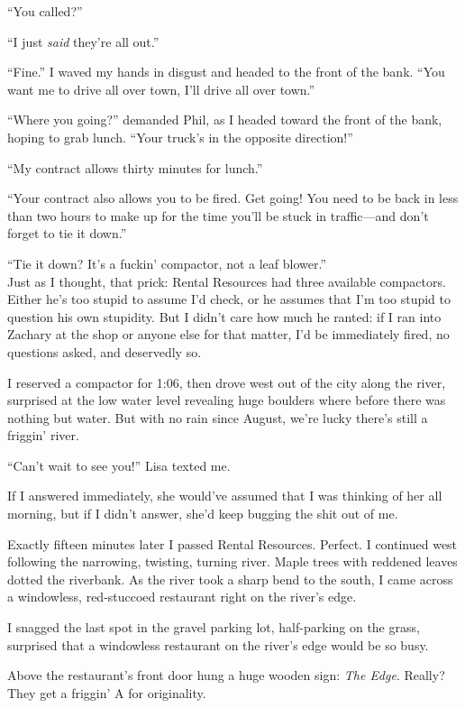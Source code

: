 ``You called?''

``I just \emph{said} they're all out.''

``Fine.'' I waved my hands in disgust and headed to the front of the
bank. ``You want me to drive all over town, I'll drive all over town.''

``Where you going?'' demanded Phil, as I headed toward the front of the
bank, hoping to grab lunch. ``Your truck's in the opposite direction!''

``My contract allows thirty minutes for lunch.''

``Your contract also allows you to be fired. Get going! You need to be
back in less than two hours to make up for the time you'll be stuck in
traffic---and don't forget to tie it down.''

``Tie it down? It's a fuckin' compactor, not a leaf blower.''\\

Just as I thought, that prick: Rental Resources had three available
compactors. Either he's too stupid to assume I'd check, or he assumes
that I'm too stupid to question his own stupidity. But I didn't care how
much he ranted: if I ran into Zachary at the shop or anyone else for
that matter, I'd be immediately fired, no questions asked, and
deservedly so.

I reserved a compactor for 1:06, then drove west out of the city along
the river, surprised at the low water level revealing huge boulders
where before there was nothing but water. But with no rain since August,
we're lucky there's still a friggin' river.

``Can't wait to see you!'' Lisa texted me.

If I answered immediately, she would've assumed that I was thinking of
her all morning, but if I didn't answer, she'd keep bugging the shit out
of me.

Exactly fifteen minutes later I passed Rental Resources. Perfect. I
continued west following the narrowing, twisting, turning river. Maple
trees with reddened leaves dotted the riverbank. As the river took a
sharp bend to the south, I came across a windowless, red-stuccoed
restaurant right on the river's edge.

I snagged the last spot in the gravel parking lot, half-parking on the
grass, surprised that a windowless restaurant on the river's edge would
be so busy.

Above the restaurant's front door hung a huge wooden sign: \emph{The
Edge}. Really? They get a friggin' A for originality.

